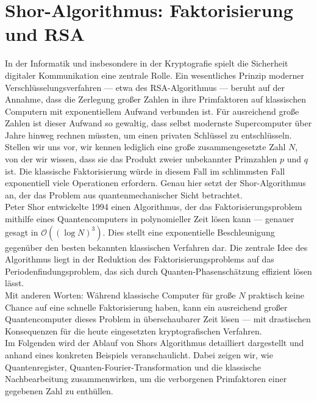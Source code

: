 {\section{Shor-Algorithmus: Faktorisierung und RSA}

In der Informatik und insbesondere in der Kryptografie spielt die Sicherheit digitaler Kommunikation eine zentrale Rolle. Ein wesentliches Prinzip moderner Verschlüsselungsverfahren — etwa des RSA-Algorithmus — beruht auf der Annahme, dass die Zerlegung großer Zahlen in ihre Primfaktoren auf klassischen Computern mit exponentiellem Aufwand verbunden ist. Für ausreichend große Zahlen ist dieser Aufwand so gewaltig, dass selbst modernste Supercomputer über Jahre hinweg rechnen müssten, um einen privaten Schlüssel zu entschlüsseln.\\

Stellen wir uns vor, wir kennen lediglich eine große zusammengesetzte Zahl $N$, von der wir wissen, dass sie das Produkt zweier unbekannter Primzahlen $p$ und $q$ ist. Die klassische Faktorisierung würde in diesem Fall im schlimmsten Fall exponentiell viele Operationen erfordern. Genau hier setzt der Shor-Algorithmus an, der das Problem aus quantenmechanischer Sicht betrachtet.\\

Peter Shor entwickelte 1994 einen Algorithmus, der das Faktorisierungsproblem mithilfe eines Quantencomputers in polynomieller Zeit lösen kann — genauer gesagt in $\mathcal{O}((\log N)^3)$. Dies stellt eine exponentielle Beschleunigung gegenüber den besten bekannten klassischen Verfahren dar. Die zentrale Idee des Algorithmus liegt in der Reduktion des Faktorisierungsproblems auf das Periodenfindungsproblem, das sich durch Quanten-Phasenschätzung effizient lösen lässt.\\

Mit anderen Worten: Während klassische Computer für große $N$ praktisch keine Chance auf eine schnelle Faktorisierung haben, kann ein ausreichend großer Quantencomputer dieses Problem in überschaubarer Zeit lösen — mit drastischen Konsequenzen für die heute eingesetzten kryptografischen Verfahren.\\

Im Folgenden wird der Ablauf von Shors Algorithmus detailliert dargestellt und anhand eines konkreten Beispiels veranschaulicht. Dabei zeigen wir, wie Quantenregister, Quanten-Fourier-Transformation und die klassische Nachbearbeitung zusammenwirken, um die verborgenen Primfaktoren einer gegebenen Zahl zu enthüllen.\\


}
